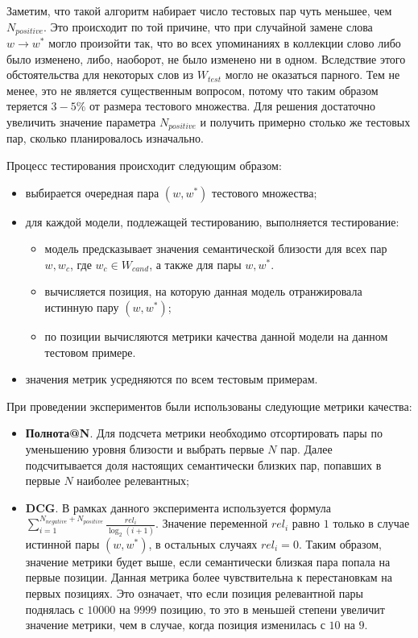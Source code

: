 Заметим, что такой алгоритм набирает число тестовых пар чуть меньшее, чем $N_{positive}$. Это происходит по той причине, что при случайной замене слова $w \rightarrow w^*$ могло произойти так, что во всех упоминаниях в коллекции слово либо было изменено, либо, наоборот, не было изменено ни в одном. Вследствие этого обстоятельства для некоторых слов из $W_{test}$ могло не оказаться парного. Тем не менее, это не является существенным вопросом, потому что таким образом теряется $3-5\%$ от размера тестового множества. Для решения достаточно увеличить значение параметра $N_{positive}$ и получить примерно столько же тестовых пар, сколько планировалось изначально.

Процесс тестирования происходит следующим образом:
\begin{itemize}
    \item выбирается очередная пара $(w, w^*)$ тестового множества;
    \item для каждой модели, подлежащей тестированию, выполняется тестирование:
        \begin{itemize}
            \item модель предсказывает значения семантической близости для всех пар $w, w_c$, где $w_c \in W_{cand}$, а также для пары $w, w^*$.
            \item вычисляется позиция, на которую данная модель отранжировала истинную пару $(w, w^*)$;
            \item по позиции вычисляются метрики качества данной модели на данном тестовом примере.
        \end{itemize}
    \item значения метрик усредняются по всем тестовым примерам.
\end{itemize}

При проведении экспериментов были использованы следующие метрики качества:
\begin{itemize}
    \item \textbf{Полнота@N}. Для подсчета метрики необходимо отсортировать пары по уменьшению уровня близости и выбрать первые $N$ пар. Далее подсчитывается доля настоящих семантически близких пар, попавших в первые $N$ наиболее релевантных;
    \item \textbf{DCG}. В рамках данного эксперимента используется формула $\sum_{i=1}^{N_{negative} + N_{positive}} \frac{rel_i}{\log_2(i + 1)}$. Значение переменной $rel_i$ равно $1$ только в случае истинной пары $(w, w^*)$, в остальных случаях $rel_i=0$. Таким образом, значение метрики будет выше, если семантически близкая пара попала на первые позиции. Данная метрика более чувствительна к перестановкам на первых позициях. Это означает, что если позиция релевантной пары поднялась с $10000$ на $9999$ позицию, то это в меньшей степени увеличит значение метрики, чем в случае, когда позиция изменилась с $10$ на $9$.
\end{itemize}

